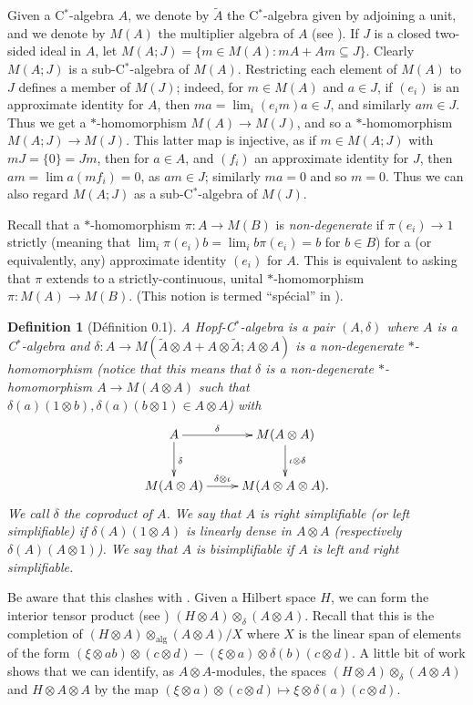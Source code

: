 \documentclass[a4paper,12pt]{article}
\theoremstyle{plain}
\newtheorem{definition}[proposition]{Definition}
\theoremstyle{definition}
\newcommand{\unit}[1]{\tilde{#1}}
\newcommand{\alg}{{\operatorname{alg}}}
\begin{document}
Given a C$^*$-algebra $A$, we denote by $\unit{A}$ the C$^*$-algebra given
by adjoining a unit, and we denote by $M(A)$ the multiplier algebra of $A$
(see \cite[3.12]{r33}).  If $J$ is a closed two-sided ideal in $A$, let
$M(A;J) = \{ m\in M(A) : mA + Am \subseteq J \}$.  Clearly $M(A;J)$ is a
sub-C$^*$-algebra of $M(A)$.  Restricting each element of $M(A)$ to $J$
defines a member of $M(J)$; indeed, for $m\in M(A)$ and $a\in J$, if $(e_i)$
is an approximate identity for $A$, then $ma = \lim_i (e_im)a \in J$, and
similarly $am\in J$.  Thus we get a $*$-homomorphism $M(A) \rightarrow M(J)$,
and so a $*$-homomorphism $M(A;J) \rightarrow M(J)$.  This latter map is
injective, as if $m\in M(A;J)$ with $mJ=\{0\}=Jm$, then for $a\in A$, and
$(f_i)$ an approximate identity for $J$, then $am = \lim a(mf_i) = 0$,
as $am\in J$; similarly $ma=0$ and so $m=0$.  Thus we can also regard
$M(A;J)$ as a sub-C$^*$-algebra of $M(J)$.

Recall that a $*$-homomorphism $\pi:A\rightarrow M(B)$ is \emph{non-degenerate}
if $\pi(e_i)\rightarrow 1$ strictly (meaning that $\lim_i \pi(e_i)b =
\lim_i b\pi(e_i) = b$ for $b\in B$) for a (or equivalently, any) approximate
identity $(e_i)$ for $A$.  This is equivalent to asking that $\pi$ extends to
a strictly-continuous, unital $*$-homomorphism $\pi:M(A)\rightarrow M(B)$.
(This notion is termed ``sp\'ecial'' in \cite{r50}).

\begin{definition}[D\'efinition 0.1]
A \emph{Hopf-C$^*$-algebra} is a pair $(A,\delta)$ where $A$ is a C$^*$-algebra
and $\delta:A\rightarrow M(\unit{A}\otimes A + A\otimes\unit{A};A\otimes A)$
is a non-degenerate $*$-homomorphism (notice that this means that
$\delta$ is a non-degenerate $*$-homomorphism $A\rightarrow M(A\otimes A)$
such that $\delta(a)(1\otimes b), \delta(a)(b\otimes 1) \in A\otimes A$)
with
\[ \xymatrix{ A \ar[r]^-{\delta} \ar[d]^{\delta} & M(A\otimes A)
\ar[d]^{\iota\otimes\delta} \\ M(A\otimes A) \ar[r]^-{\delta\otimes\iota} &
M(A\otimes A\otimes A). } \]
We call $\delta$ the \emph{coproduct} of $A$.  We say that $A$ is
right simplifiable (or left simplifiable) if $\delta(A)(1\otimes A)$ is linearly
dense in $A\otimes A$ (respectively $\delta(A)(A\otimes 1)$).  We say that
$A$ is bisimplifiable if $A$ is left and right simplifiable.
\end{definition}

Be aware that this clashes with \cite[1.1]{r2}.  Given a Hilbert space $H$,
we can form the interior tensor product (see \cite[Chapter~4]{lance})
$(H\otimes A) \otimes_\delta (A\otimes A)$.  Recall that this is the completion
of $(H\otimes A) \otimes_\alg (A\otimes A) / X$ where $X$ is the linear span of
elements of the form $(\xi\otimes ab)\otimes(c\otimes d) - (\xi\otimes a)
\otimes \delta(b)(c\otimes d)$.  A little bit of work shows that we can
identify, as $A\otimes A$-modules, the spaces $(H\otimes A) \otimes_\delta
(A\otimes A)$ and $H\otimes A\otimes A$ by the map
$(\xi\otimes a)\otimes(c\otimes d) \mapsto \xi\otimes \delta(a)(c\otimes d)$.
\end{document}
